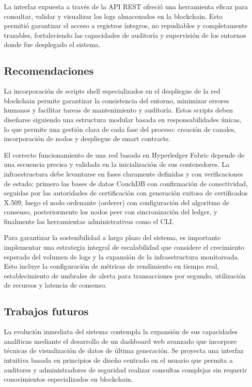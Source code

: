 La interfaz expuesta a través de la API REST ofreció una herramienta eficaz para consultar, validar y visualizar los logs almacenados en la blockchain. Esto permitió garantizar el acceso a registros íntegros, no repudiables y completamente trazables, fortaleciendo las capacidades de auditoría y supervisión de los entornos donde fue desplegado el sistema.


\subsection{Recomendaciones}

La incorporación de scripts shell especializados en el despliegue de la red blockchain permite garantizar la consistencia del entorno, minimizar errores humanos y facilitar tareas de mantenimiento y auditoría. Estos scripts deben diseñarse siguiendo una estructura modular basada en responsabilidades únicas, lo que permite una gestión clara de cada fase del proceso: creación de canales, incorporación de nodos y despliegue de smart contracts.

El correcto funcionamiento de una red basada en Hyperledger Fabric depende de una secuencia precisa y validada en la inicialización de sus contenedores. La infraestructura debe levantarse en fases claramente definidas y con verificaciones de estado: primero las bases de datos CouchDB con confirmación de conectividad, seguidas por las autoridades de certificación con generación exitosa de certificados X.509, luego el nodo ordenante (orderer) con configuración del algoritmo de consenso, posteriormente los nodos peer con sincronización del ledger, y finalmente las herramientas administrativas como el CLI.

Para garantizar la sostenibilidad a largo plazo del sistema, es importante implementar una estrategia integral de escalabilidad que considere el crecimiento esperado del volumen de logs y la expansión de la infraestructura monitoreada. Esto incluye la configuración de métricas de rendimiento en tiempo real, establecimiento de umbrales de alerta para transacciones por segundo, utilización de recursos y latencia de consenso.


\subsection{Trabajos futuros}

La evolución inmediata del sistema contempla la expansión de sus capacidades analíticas mediante el desarrollo de un dashboard web avanzado que incorpore técnicas de visualización de datos de última generación. Se proyecta una interfaz intuitiva basada en principios de diseño centrado en el usuario que permita a auditores y administradores de seguridad realizar consultas complejas sin requerir conocimientos especializados en blockchain.

